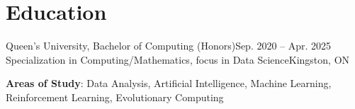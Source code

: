 \section{Education}
  \resumeSubHeadingListStart
    \resumeSubheading
      {Queen's University, Bachelor of Computing (Honors)}{Sep. 2020 -- Apr. 2025}
      {Specialization in Computing/Mathematics, focus in Data Science}{Kingston, ON}
      \begin{itemize}[leftmargin=0.0in, label={}]
    \small{\item{
     \textbf{Areas of Study}{: Data Analysis, Artificial Intelligence, Machine Learning, Reinforcement Learning, Evolutionary Computing}
    }}
 \end{itemize}
  \resumeSubHeadingListEnd